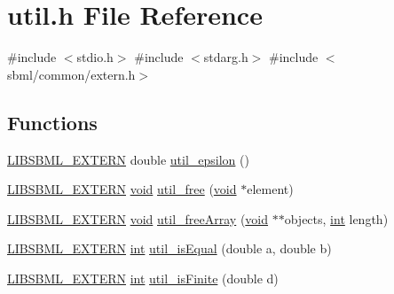 \hypertarget{dependencies_2libsbml-5_815_80-vs2017-release-64_2include_2sbml_2util_2util_8h}{}\section{util.\+h File Reference}
\label{dependencies_2libsbml-5_815_80-vs2017-release-64_2include_2sbml_2util_2util_8h}
{\ttfamily \#include $<$stdio.\+h$>$}\newline
{\ttfamily \#include $<$stdarg.\+h$>$}\newline
{\ttfamily \#include $<$sbml/common/extern.\+h$>$}\newline
\subsection*{Functions}
\begin{DoxyCompactItemize}
\item 
\hyperlink{extern_8h_a8e9e5118f0c55d410f8bc217f2954dbf}{L\+I\+B\+S\+B\+M\+L\+\_\+\+E\+X\+T\+E\+RN} double \hyperlink{dependencies_2libsbml-5_815_80-vs2017-release-64_2include_2sbml_2util_2util_8h_a3777126fa39b40192579401597ce2bb8}{util\+\_\+epsilon} ()
\item 
\hyperlink{extern_8h_a8e9e5118f0c55d410f8bc217f2954dbf}{L\+I\+B\+S\+B\+M\+L\+\_\+\+E\+X\+T\+E\+RN} \hyperlink{lp__lib_8h_ac7828c7b2b31d2e11af17bdb6289c5d9}{void} \hyperlink{dependencies_2libsbml-5_815_80-vs2017-release-64_2include_2sbml_2util_2util_8h_a68be89de8c3611f4adf0bd1906875606}{util\+\_\+free} (\hyperlink{lp__lib_8h_ac7828c7b2b31d2e11af17bdb6289c5d9}{void} $\ast$element)
\item 
\hyperlink{extern_8h_a8e9e5118f0c55d410f8bc217f2954dbf}{L\+I\+B\+S\+B\+M\+L\+\_\+\+E\+X\+T\+E\+RN} \hyperlink{lp__lib_8h_ac7828c7b2b31d2e11af17bdb6289c5d9}{void} \hyperlink{dependencies_2libsbml-5_815_80-vs2017-release-64_2include_2sbml_2util_2util_8h_a322d811aff951aaba39641d1ad148db9}{util\+\_\+free\+Array} (\hyperlink{lp__lib_8h_ac7828c7b2b31d2e11af17bdb6289c5d9}{void} $\ast$$\ast$objects, \hyperlink{lp__lib_8h_adeb9ec6400320e4923ac9d836d509ddb}{int} length)
\item 
\hyperlink{extern_8h_a8e9e5118f0c55d410f8bc217f2954dbf}{L\+I\+B\+S\+B\+M\+L\+\_\+\+E\+X\+T\+E\+RN} \hyperlink{lp__lib_8h_adeb9ec6400320e4923ac9d836d509ddb}{int} \hyperlink{dependencies_2libsbml-5_815_80-vs2017-release-64_2include_2sbml_2util_2util_8h_a5390af41d7ec3083c95f2e5c9f3d21f1}{util\+\_\+is\+Equal} (double a, double b)
\item 
\hyperlink{extern_8h_a8e9e5118f0c55d410f8bc217f2954dbf}{L\+I\+B\+S\+B\+M\+L\+\_\+\+E\+X\+T\+E\+RN} \hyperlink{lp__lib_8h_adeb9ec6400320e4923ac9d836d509ddb}{int} \hyperlink{dependencies_2libsbml-5_815_80-vs2017-release-64_2include_2sbml_2util_2util_8h_a210ab95f5464663a89c1d12733a3dc3f}{util\+\_\+is\+Finite} (double d)
$$
\end{DoxyCompactItemize}
